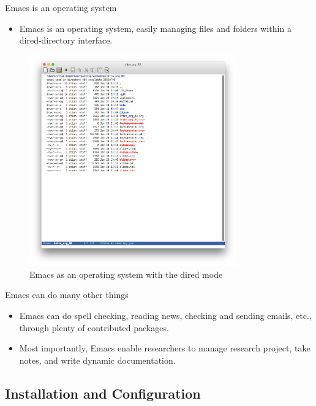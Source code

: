 \documentclass[presentation]{beamer}
\begin{document}
\begin{frame}[label={sec:org5dd4b0d}]{Emacs is an operating system}
\begin{itemize}
\item Emacs is an operating system, easily managing files and folders
within a dired-directory interface.
\end{itemize}

\begin{figure}[htbp]
\centering
\includegraphics[width=0.8\textwidth]{figure/dired_example.png}
\caption{Emacs as an operating system with the dired mode}
\end{figure}
\end{frame}

\begin{frame}[label={sec:orge492643}]{Emacs can do many other things}
\begin{itemize}
\item Emacs can do spell checking, reading news, checking and sending
emails, etc., through plenty of contributed packages.
\item Most importantly, Emacs enable researchers to manage research
project, take notes, and write dynamic documentation.
\end{itemize}
\end{frame}


\subsection*{Installation and Configuration}
\label{sec:org9720bf9}
\end{document}

